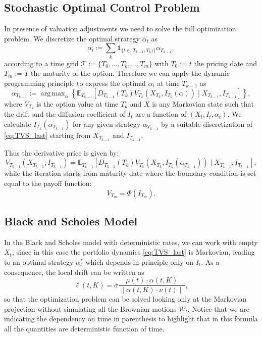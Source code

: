 \documentclass[11pt]{article}
\DeclareMathOperator*{\argmax}{arg\,max}
\begin{document}
\subsection{Stochastic Optimal Control Problem}
In presence of valuation adjustments we need to solve the full optimization problem. We discretize the optimal strategy $\alpha_t$ as
\begin{equation}
    \alpha_t \coloneqq \sum_k \mathbf{1}_{ \{t \in [T_{k-1}, T_k)\}}\alpha_{T_{k-1}},
\label{eq:piecewise_strategy}\end{equation}
according to a time grid $\mathcal{T}:=\{T_0,...,T_k,...,T_m\}$ with $T_0:=t$ the pricing date and $T_m :=T$ the maturity of the option. 
Therefore we can apply the dynamic programming principle to express the optimal $\alpha_t$ at time $T_{k-1}$ as
\begin{equation}
    \alpha_{T_{k-1}}:=\argmax_{\alpha} \left\{\mathbb{E}_{T_{k-1}}\left[D_{T_{k-1}}\left(T_{k} \right) V_{T_{k}}\left(X_{T_{k}}, I_{T_{k}}(\alpha)\right) \mid X_{T_{k-1}}, I_{T_{k-1}}\right]\right\},
\end{equation}
where $V_{T_k}$ is the option value at time $T_k$ and $X$ is any Markovian state such that the drift and the diffusion coefficient of $I_t$ are a function of $\left(X_t,I_t,\alpha_t\right)$. We calculate $I_{T_k}\left(\alpha_{T_{k-1}}\right)$ for any given strategy $\alpha_{T_{k-1}}$ by a suitable discretization of \eqref{eq:TVS_last} starting from $X_{T_{k-1}}$ and $I_{T_{k-1}}$.

Thus the derivative price is given by:
\begin{equation}
    V_{T_{k-1}}\left(X_{T_{k-1}}, I_{T_{k-1}}\right)=\mathbb{E}_{T_{k-1}}\left[D_{T_{k-1}}\left(T_{k}\right) V_{T_{k}}\left(X_{T_{k}}, I_{T_{k}}\left(\alpha_{T_{k-1}}\right)\right) \mid X_{T_{k-1}}, I_{T_{k-1}}\right],
\label{recursion}\end{equation}
while the iteration starts from maturity date where the boundary condition is set equal to the payoff function:
\begin{equation}
    V_{T_m} = \Phi\left(I_{T_m}\right).
\end{equation}
\subsection{Black and Scholes Model}
In the Black and Scholes model with deterministic rates, we can work with empty $X_t$, since in this case the portfolio dynamics \eqref{eq:TVS_last} is Markovian, leading to an optimal strategy $\alpha_t^*$ which depends in principle only on $I_t$. As a consequence, the local drift can be written as
\begin{equation}
     \ell \left(t,K\right) = \bar{\sigma}   \frac{\mu\left(t\right) \cdot \alpha\left(t,K\right)}{\|\alpha\left(t,K\right) \cdot \nu\left(t\right)\|},  
\end{equation}
so that the optimization problem can be solved looking only at the Markovian projection without simulating all the Brownian motions $W_t$. Notice that we are indicating the dependency on time in parenthesis to highlight that in this formula all the quantities are deterministic function of time.
\end{document}
